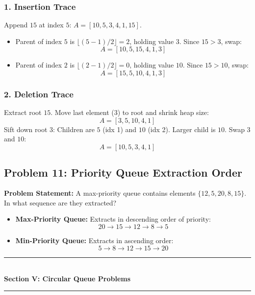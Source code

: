 \subsubsection*{1. Insertion Trace}
Append $15$ at index $5$: $A = [10, 5, 3, 4, 1, 15]$.
\begin{itemize}
    \item Parent of index $5$ is $\lfloor (5-1)/2 \rfloor = 2$, holding value $3$. Since $15 > 3$, swap:
    \[
    A = [10, 5, 15, 4, 1, 3]
    \]
    \item Parent of index $2$ is $\lfloor (2-1)/2 \rfloor = 0$, holding value $10$. Since $15 > 10$, swap:
    \[
    \boxed{A = [15, 5, 10, 4, 1, 3]}
    \]
\end{itemize}

\subsubsection*{2. Deletion Trace}
Extract root $15$. Move last element ($3$) to root and shrink heap size:
\[
A = [3, 5, 10, 4, 1]
\]
Sift down root $3$: Children are $5$ (idx 1) and $10$ (idx 2). Larger child is $10$. Swap $3$ and $10$:
\[
\boxed{A = [10, 5, 3, 4, 1]}
\]

\subsection{Problem 11: Priority Queue Extraction Order}

\textbf{Problem Statement:} A max-priority queue contains elements $\{12, 5, 20, 8, 15\}$. In what sequence are they extracted?
\begin{itemize}
    \item \textbf{Max-Priority Queue:} Extracts in descending order of priority:
    \[
    20 \longrightarrow 15 \longrightarrow 12 \longrightarrow 8 \longrightarrow 5
    \]
    \item \textbf{Min-Priority Queue:} Extracts in ascending order:
    \[
    5 \longrightarrow 8 \longrightarrow 12 \longrightarrow 15 \longrightarrow 20
    \]
\end{itemize}

\newpage
\begin{center}
\vspace{0.5em}
{\color{primary}\rule{0.45\textwidth}{1.2pt}}\\[4pt]
{\Large\bfseries\color{primary} Section V: Circular Queue Problems}\\[2pt]
{\color{primary}\rule{0.45\textwidth}{1.2pt}}
\vspace{0.5em}
\end{center}

